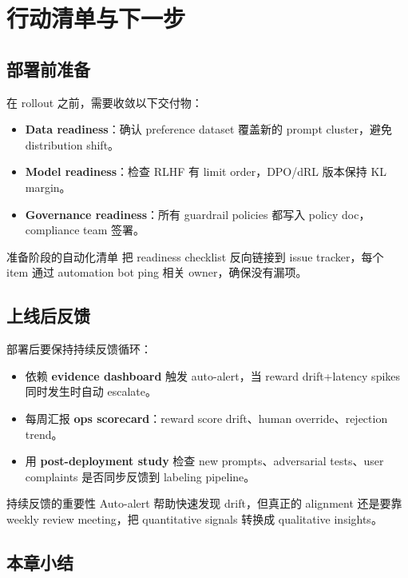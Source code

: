 \documentclass[a4paper]{article}
\begin{document}
\section{行动清单与下一步}

\subsection{部署前准备}

在 rollout 之前，需要收敛以下交付物：
\begin{itemize}
    \item \textbf{Data readiness}：确认 preference dataset 覆盖新的 prompt cluster，避免 distribution shift。
    \item \textbf{Model readiness}：检查 RLHF 有 limit order，DPO/dRL 版本保持 KL margin。
    \item \textbf{Governance readiness}：所有 guardrail policies 都写入 policy doc，compliance team 签署。
\end{itemize}

\begin{knowledgebox}{准备阶段的自动化清单}
把 readiness checklist 反向链接到 issue tracker，每个 item 通过 automation bot ping 相关 owner，确保没有漏项。
\end{knowledgebox}

\subsection{上线后反馈}

部署后要保持持续反馈循环：
\begin{itemize}
    \item 依赖 \textbf{evidence dashboard} 触发 auto-alert，当 reward drift+latency spikes 同时发生时自动 escalate。
    \item 每周汇报 \textbf{ops scorecard}：reward score drift、human override、rejection trend。
    \item 用 \textbf{post-deployment study} 检查 new prompts、adversarial tests、user complaints 是否同步反馈到 labeling pipeline。
\end{itemize}

\begin{importantbox}{持续反馈的重要性}
Auto-alert 帮助快速发现 drift，但真正的 alignment 还是要靠 weekly review meeting，把 quantitative signals 转换成 qualitative insights。
\end{importantbox}

\subsection{本章小结}
\end{document}
